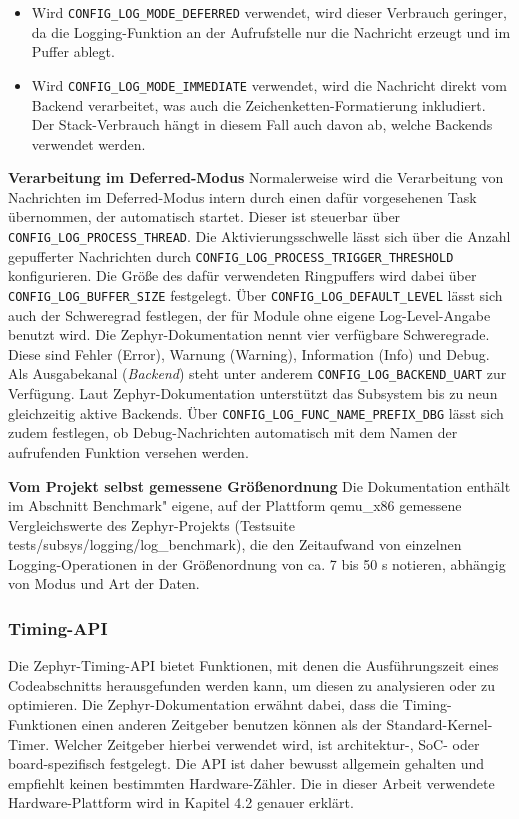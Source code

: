 \begin{itemize}
\item Wird \lstinline[style=fileinline]|CONFIG_LOG_MODE_DEFERRED| verwendet, wird dieser Verbrauch geringer, da die Logging-Funktion an der Aufrufstelle nur die Nachricht erzeugt und im Puffer ablegt.
\item Wird \lstinline[style=fileinline]|CONFIG_LOG_MODE_IMMEDIATE| verwendet, wird die Nachricht direkt vom Backend verarbeitet, was auch die Zeichenketten-Formatierung inkludiert. Der Stack-Verbrauch h{\"a}ngt in diesem Fall auch davon ab, welche Backends verwendet werden.
\end{itemize}
\textbf{Verarbeitung im Deferred-Modus} Normalerweise wird die Verarbeitung von Nachrichten im Deferred-Modus intern durch einen daf{\"u}r vorgesehenen Task {\"u}bernommen, der automatisch startet. Dieser ist steuerbar {\"u}ber \lstinline[style=fileinline]|CONFIG_LOG_PROCESS_THREAD|. Die Aktivierungsschwelle l{\"a}sst sich {\"u}ber die Anzahl gepufferter Nachrichten durch \lstinline[style=fileinline]|CONFIG_LOG_PROCESS_TRIGGER_THRESHOLD| konfigurieren. Die Gr{\"o}{\ss}e des daf{\"u}r verwendeten Ringpuffers wird dabei {\"u}ber \lstinline[style=fileinline]|CONFIG_LOG_BUFFER_SIZE| festgelegt. {\"U}ber \lstinline[style=fileinline]|CONFIG_LOG_DEFAULT_LEVEL| l{\"a}sst sich auch der Schweregrad festlegen, der f{\"u}r Module ohne eigene Log-Level-Angabe benutzt wird. Die Zephyr-Dokumentation nennt vier verf{\"u}gbare Schweregrade. Diese sind Fehler (Error), Warnung (Warning), Information (Info) und Debug. Als Ausgabekanal (\emph{Backend}) steht unter anderem \lstinline[style=fileinline]|CONFIG_LOG_BACKEND_UART| zur Verf{\"u}gung. Laut Zephyr-Dokumentation unterst{\"u}tzt das Subsystem bis zu neun gleichzeitig aktive Backends. {\"U}ber \lstinline[style=fileinline]|CONFIG_LOG_FUNC_NAME_PREFIX_DBG| l{\"a}sst sich zudem festlegen, ob Debug-Nachrichten automatisch mit dem Namen der aufrufenden Funktion versehen werden.

\textbf{Vom Projekt selbst gemessene Gr{\"o}{\ss}enordnung} Die Dokumentation enth{\"a}lt im Abschnitt \glqq{}Benchmark" eigene, auf der Plattform qemu\_x86 gemessene Vergleichswerte des Zephyr-Projekts (Testsuite tests/subsys/logging/log\_benchmark), die den Zeitaufwand von einzelnen Logging-Operationen in der Gr{\"o}{\ss}enordnung von ca. 7 bis 50 \textmu{}s notieren, abh{\"a}ngig von Modus und Art der Daten.

\subsubsection{Timing-API}
Die Zephyr-Timing-API bietet Funktionen, mit denen die Ausf{\"u}hrungszeit eines Codeabschnitts herausgefunden werden kann, um diesen zu analysieren oder zu optimieren. Die Zephyr-Dokumentation erw{\"a}hnt dabei, dass die Timing-Funktionen einen anderen Zeitgeber benutzen k{\"o}nnen als der Standard-Kernel-Timer. Welcher Zeitgeber hierbei verwendet wird, ist architektur-, SoC- oder board-spezifisch festgelegt. Die API ist daher bewusst allgemein gehalten und empfiehlt keinen bestimmten Hardware-Z{\"a}hler. Die in dieser Arbeit verwendete Hardware-Plattform wird in Kapitel 4.2 genauer erkl{\"a}rt.

